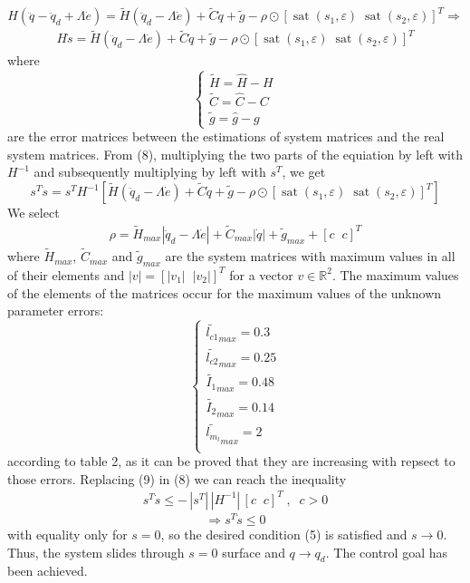 \documentclass[a4paper]{article}
\newcommand\R{\mathbb{R}}
\begin{document}
    $$
        H (\ddot{q} - \ddot{q}_{d} + \Lambda \dot{e}) = 
        \tilde{H} (\ddot{q}_{d} - \Lambda \dot{e}) + \tilde{C} \dot{q} + \tilde{g} - \rho \odot [\operatorname{sat}(s_1, \varepsilon) \; \operatorname{sat}(s_2, \varepsilon)]^T \Rightarrow
    $$
    \begin{align}
        H \dot{s} = 
        \tilde{H} (\ddot{q}_{d} - \Lambda \dot{e}) + \tilde{C} \dot{q} + \tilde{g} - \rho \odot [\operatorname{sat}(s_1, \varepsilon) \; \operatorname{sat}(s_2, \varepsilon)]^T
    \end{align}
    where 
    $$
    \begin{cases}
        \tilde{H} = \hat{H} - H \\ 
        \tilde{C} = \hat{C} - C \\ 
        \tilde{g} = \hat{g} - g 
    \end{cases}
    $$
    are the error matrices between the estimations 
    of system matrices and the real system matrices. 
    From (8), multiplying the two parts of the equiation by left with $H^{-1}$ and subsequently multiplying by left with $s^T$, 
    we get 
    $$
        s^T \dot{s} = 
        s^T H^{-1} \left[ \tilde{H} (\ddot{q}_{d} - 
        \Lambda \dot{e}) + \tilde{C} \dot{q} + \tilde{g} - 
        \rho \odot [\operatorname{sat}(s_1, \varepsilon) \; \operatorname{sat}(s_2, \varepsilon)]^T \right]
    $$
    We select
    \begin{align}
        \rho = \tilde{H}_{max} | \ddot{q}_{d} - 
        \Lambda \dot{e} | + \tilde{C}_{max} | \dot{q} | + \tilde{g}_{max} + [c \;\; c]^T        
    \end{align}
    where $\tilde{H}_{max}$, $\tilde{C}_{max}$ and $\tilde{g}_{max}$ are the system matrices with maximum 
    values in all of their elements and $|v| = [|v_1| \;\; |v_2|]^T$ for a vector $v \in \R^2$. 
    The maximum values of the elements of the matrices occur for the maximum values of the unknown parameter errors: 
    $$
        \begin{cases}
            \tilde{l_{c1}}_{max} = 0.3 \\
            \tilde{l_{c2}}_{max} = 0.25 \\
            \tilde{I_{1}}_{max} = 0.48 \\
            \tilde{I_{2}}_{max} = 0.14 \\
            \tilde{l_{m_l}}_{max} = 2 \\
        \end{cases}
    $$
    according to table 2, as it can be proved that they are increasing with repsect to those errors. Replacing (9) in (8) 
    we can reach the inequality 
    \begin{align}
        s^T \dot{s} \le - \, |s^T| \, |H^{-1}| \, [c \;\; c]^T \;, \;\; c>0
    \end{align}
    $$
        \Rightarrow s^T \dot{s} \le 0       
    $$
    with equality only for $s=0$, so the desired condition (5) is satisfied and $s \rightarrow 0$. Thus, the system 
    slides through $s=0$ surface and $q \rightarrow q_d$. The control goal has been achieved.
\end{document}
